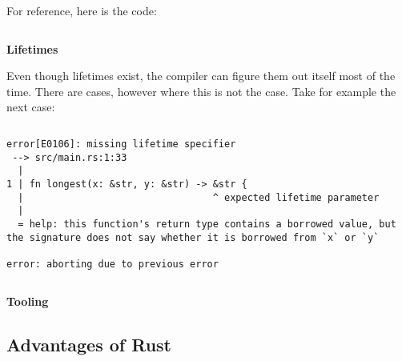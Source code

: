 For reference, here is the code:
\inputminted[linenos,fontsize=\small]{Rust}{code/code_ownership2.rs}

\textbf{Lifetimes}

Even though lifetimes exist, the compiler can figure them out itself most of
the time. There are cases, however where this is not the case. Take for example
the next case:

\inputminted[linenos,fontsize=\small]{Rust}{code/code_lifetimes2.rs}

{\small
\begin{verbatim}
error[E0106]: missing lifetime specifier
 --> src/main.rs:1:33
  |
1 | fn longest(x: &str, y: &str) -> &str {
  |                                 ^ expected lifetime parameter
  |
  = help: this function's return type contains a borrowed value, but the signature does not say whether it is borrowed from `x` or `y`

error: aborting due to previous error
\end{verbatim}}

\inputminted[linenos,fontsize=\small]{Rust}{code/code_lifetimes.rs}


\textbf{Tooling}\label{sec:tools}






\subsection{Advantages of Rust}


